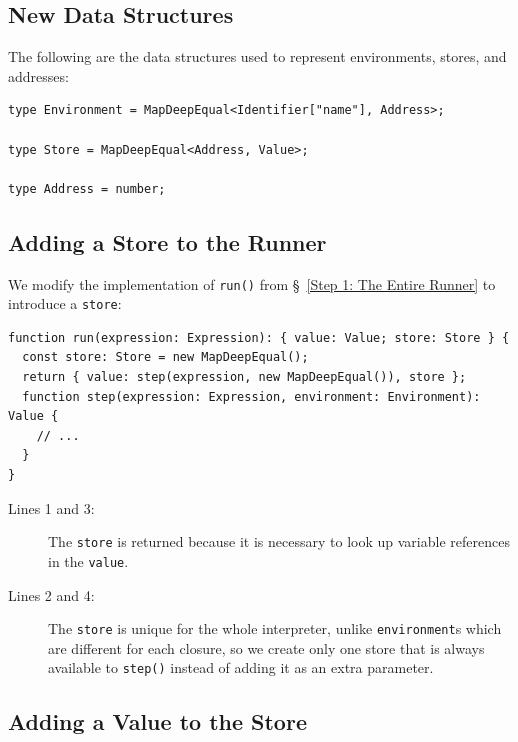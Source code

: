 \documentclass[12pt, oneside]{book}
\begin{document}
\subsection{New Data Structures}

The following are the data structures used to represent environments, stores, and addresses:

\begin{verbatim}
type Environment = MapDeepEqual<Identifier["name"], Address>;

type Store = MapDeepEqual<Address, Value>;

type Address = number;
\end{verbatim}

\subsection{Adding a Store to the Runner}

We modify the implementation of \texttt{run()} from §~\ref{Step 1: The Entire Runner} to introduce a \texttt{store}:

\begin{verbatim}
function run(expression: Expression): { value: Value; store: Store } {
  const store: Store = new MapDeepEqual();
  return { value: step(expression, new MapDeepEqual()), store };
  function step(expression: Expression, environment: Environment): Value {
    // ...
  }
}
\end{verbatim}

\begin{description}
\item [Lines 1 and 3:]

The \texttt{store} is returned because it is necessary to look up variable references in the \texttt{value}.

\item [Lines 2 and 4:]

The \texttt{store} is unique for the whole interpreter, unlike \texttt{environment}s which are different for each closure, so we create only one store that is always available to \texttt{step()} instead of adding it as an extra parameter.
\end{description}

\subsection{Adding a Value to the Store}
\label{Adding a Value to the Store}
\end{document}
